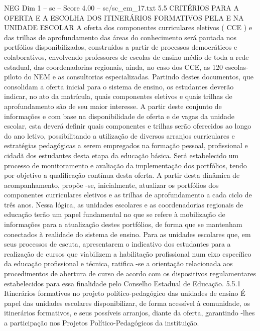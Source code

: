 \begin{textsample}{NEG Dim 1 – sc – Score 4.00 – sc/sc\_em\_17.txt}  \label{ex:f1_neg_273}
5.5 CRITÉRIOS PARA A OFERTA E A ESCOLHA DOS ITINERÁRIOS FORMATIVOS PELA E NA UNIDADE ESCOLAR A oferta dos componentes curriculares eletivos ( CCE ) e das trilhas de aprofundamento das áreas do conhecimento será pautada nos portfólios disponibilizados, construídos a partir de processos democráticos e colaborativos, envolvendo professores de escolas de ensino médio de toda a rede estadual, das coordenadorias regionais, ainda, no caso dos CCE, as 120 escolas-piloto do NEM e as consultorias especializadas.
Partindo destes documentos, que consolidam a oferta inicial para o sistema de ensino, os estudantes deverão indicar, no ato da matrícula, quais componentes eletivos e quais trilhas de aprofundamento são de seu maior interesse.
A partir deste conjunto de informações e com base na disponibilidade de oferta e de vagas da unidade escolar, esta deverá definir quais componentes e trilhas serão oferecidos ao longo do ano letivo, possibilitando a utilização de diversos arranjos curriculares e estratégias pedagógicas a serem empregados na formação pessoal, profissional e cidadã dos estudantes desta etapa da educação básica.
Será estabelecido um processo de monitoramento e avaliação da implementação dos portfólios, tendo por objetivo a qualificação contínua desta oferta.
A partir desta dinâmica de acompanhamento, propõe -se, inicialmente, atualizar os portfólios dos componentes curriculares eletivos e as trilhas de aprofundamento a cada ciclo de três anos.
Nessa lógica, as unidades escolares e as coordenadorias regionais de educação terão um papel fundamental no que se refere à mobilização de informações para a atualização destes portfólios, de forma que se mantenham conectados à realidade do sistema de ensino.
Para as unidades escolares que, em seus processos de escuta, apresentarem o indicativo dos estudantes para a realização de cursos que viabilizem a habilitação profissional num eixo específico da educação profissional e técnica, ratifica -se a orientação relacionada aos procedimentos de abertura de curso de acordo com os dispositivos regulamentares estabelecidos para essa finalidade pelo Conselho Estadual de Educação. 5.5.1 Itinerários formativos no projeto político-pedagógico das unidades de ensino É papel das unidades escolares disponibilizar, de forma acessível à comunidade, os itinerários formativos, e seus possíveis arranjos, diante da oferta, garantindo -lhes a participação nos Projetos Político-Pedagógicos da instituição.

\end{textsample}

